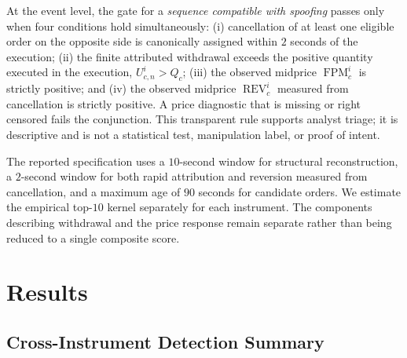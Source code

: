 \documentclass[11pt]{article}
\newenvironment{review}{\begingroup\color{blue}}{\endgroup}
\begin{document}
\begin{review}At the event level, the gate for a \textit{sequence compatible with spoofing}\end{review} passes only when four conditions hold simultaneously:
(i) \begin{review}cancellation of at least one eligible order on the opposite side\end{review} is canonically assigned within $2$ seconds of the execution;
(ii) the finite attributed withdrawal exceeds \begin{review}the positive quantity executed in the execution\end{review},
$U^{i}_{c,n}>Q_c$; (iii) the observed midprice $\operatorname{FPM}^{i}_{c}$ is strictly positive; and (iv) \begin{review}the observed midprice $\operatorname{REV}^{i}_{c}$ measured from cancellation\end{review} is strictly positive. \begin{review}A price diagnostic that is missing or right censored\end{review}
fails the conjunction. This transparent rule supports analyst triage; it is descriptive and is not a statistical test,
manipulation label, or proof of intent.

\begin{review}The reported specification uses a $10$-second window for structural reconstruction, a $2$-second window for both rapid attribution and reversion measured from cancellation, and a maximum age of $90$ seconds for candidate orders.\end{review} We estimate the empirical top-$10$ kernel separately for each
instrument. \begin{review}The components describing withdrawal and the price response\end{review} remain separate rather than being reduced to \begin{review}a single composite score\end{review}.

\section{Results}
\label{sec:results}

\subsection{Cross-Instrument Detection Summary}
\label{subsec:cross_instrument_results}
\end{document}
